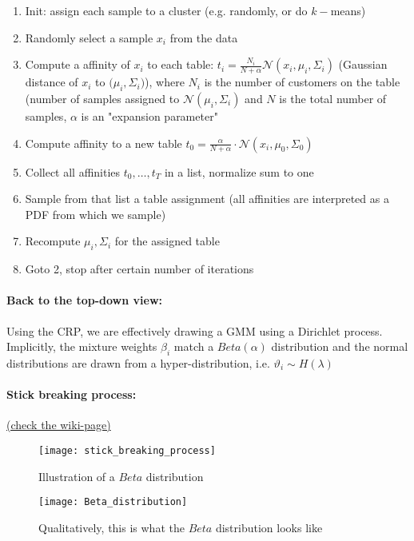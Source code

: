 \begin{enumerate}
    \item Init: assign each sample to a cluster (e.g. randomly, or do \(k-\)means)
    \item Randomly select a sample \(x_i\) from the data
    \item Compute a affinity of \(x_i\) to each table: \(t_i = \frac{N_i}{N+\alpha} \mathcal{N}(x_i, \mu_i, \Sigma_i)\) (Gaussian distance of \(x_i\) to \(\mathcal(\mu_i, \Sigma_i)\)), where \(N_i\) is the number of customers on the table (number of samples assigned to \(\mathcal{N}(\mu_i, \Sigma_i)\) and \(N\) is the total number of samples, \(\alpha\) is an "expansion parameter"
    \item Compute affinity to a new table \(t_0 = \frac{\alpha}{N + \alpha} \cdot \mathcal{N}(x_i, \mu_0, \Sigma_0)\)
    \item Collect all affinities \(t_0, \dots, t_T\) in a list, normalize sum to one
    \item Sample from that list a table assignment (all affinities are interpreted as a PDF from which we sample)
    \item Recompute \(\mu_i, \Sigma_i\) for the assigned table
    \item Goto 2, stop after certain number of iterations
\end{enumerate}

\paragraph{Back to the top-down view:}
Using the CRP, we are effectively drawing a GMM using a Dirichlet process. Implicitly, the mixture weights $\beta_i$ match a $Beta(\alpha)$ distribution and the normal distributions are drawn from a hyper-distribution, i.e. $\vartheta_i \sim H(\lambda)$

\paragraph{Stick breaking process:} \href{https://en.wikipedia.org/wiki/Dirichlet_process#The_stick-breaking_process}{(check the wiki-page)}
\begin{figure}[H]
  \centering
  \begin{minipage}[b]{0.49\textwidth}
    \texttt{[image: stick\_breaking\_process]}
    \caption{Illustration of a $Beta$ distribution}
  \end{minipage}
  \begin{minipage}[b]{0.49\textwidth}
    \texttt{[image: Beta\_distribution]}
    \caption{Qualitatively, this is what the $Beta$ distribution looks like}
  \end{minipage}
\end{figure}

